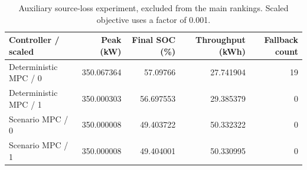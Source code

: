 \begin{table}[t]
\centering
\small
\caption{Auxiliary source-loss experiment, excluded from the main rankings. Scaled objective uses a factor of 0.001.}
\begin{tabular}{lrrrr}
\hline
Controller / scaled & Peak (kW) & Final SOC (\%) & Throughput (kWh) & Fallback count \\
\hline
Deterministic MPC / 0 & 350.067364 & 57.09766 & 27.741904 & 19 \\
Deterministic MPC / 1 & 350.000303 & 56.697553 & 29.385379 & 0 \\
Scenario MPC / 0 & 350.000008 & 49.403722 & 50.332322 & 0 \\
Scenario MPC / 1 & 350.000008 & 49.404001 & 50.330995 & 0 \\
\hline
\end{tabular}
\end{table}
